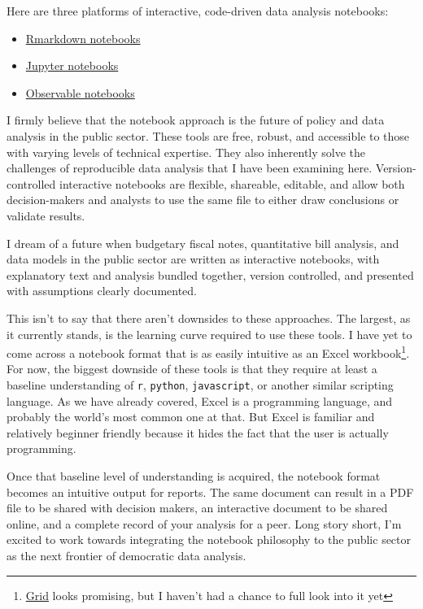 \documentclass[
]{book}
\providecommand{\tightlist}{%
  \setlength{\itemsep}{0pt}\setlength{\parskip}{0pt}}
\begin{document}
Here are three platforms of interactive, code-driven data analysis notebooks:

\begin{itemize}
\tightlist
\item
  \href{https://rmarkdown.rstudio.com}{Rmarkdown notebooks}
\item
  \href{https://jupyter-notebook.readthedocs.io/en/stable/}{Jupyter notebooks}
\item
  \href{https://observablehq.com}{Observable notebooks}
\end{itemize}

I firmly believe that the notebook approach is the future of policy and data analysis in the public sector. These tools are free, robust, and accessible to those with varying levels of technical expertise. They also inherently solve the challenges of reproducible data analysis that I have been examining here. Version-controlled interactive notebooks are flexible, shareable, editable, and allow both decision-makers and analysts to use the same file to either draw conclusions or validate results.

I dream of a future when budgetary fiscal notes, quantitative bill analysis, and data models in the public sector are written as interactive notebooks, with explanatory text and analysis bundled together, version controlled, and presented with assumptions clearly documented.

This isn't to say that there aren't downsides to these approaches. The largest, as it currently stands, is the learning curve required to use these tools. I have yet to come across a notebook format that is as easily intuitive as an Excel workbook\footnote{\href{https://beta.grid.is/@grid/what-is-grid-yBYeOyirSSKBlknj25F98A}{Grid} looks promising, but I haven't had a chance to full look into it yet}. For now, the biggest downside of these tools is that they require at least a baseline understanding of \texttt{r}, \texttt{python}, \texttt{javascript}, or another similar scripting language. As we have already covered, Excel is a programming language, and probably the world's most common one at that. But Excel is familiar and relatively beginner friendly because it hides the fact that the user is actually programming.

Once that baseline level of understanding is acquired, the notebook format becomes an intuitive output for reports. The same document can result in a PDF file to be shared with decision makers, an interactive document to be shared online, and a complete record of your analysis for a peer. Long story short, I'm excited to work towards integrating the notebook philosophy to the public sector as the next frontier of democratic data analysis.
\end{document}
